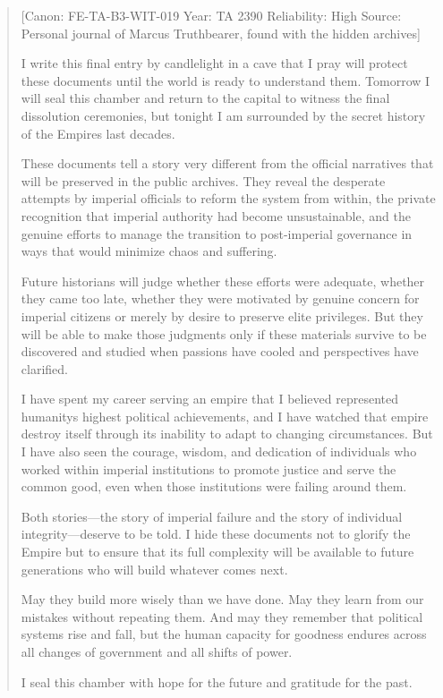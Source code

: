 \begin{quote}
{[}Canon: FE-TA-B3-WIT-019 \textbar{} Year: TA 2390 \textbar{}
Reliability: High \textbar{} Source: Personal journal of Marcus
Truthbearer, found with the hidden archives{]}

I write this final entry by candlelight in a cave that I pray will
protect these documents until the world is ready to understand them.
Tomorrow I will seal this chamber and return to the capital to witness
the final dissolution ceremonies, but tonight I am surrounded by the
secret history of the Empire\textquotesingle s last decades.

These documents tell a story very different from the official narratives
that will be preserved in the public archives. They reveal the desperate
attempts by imperial officials to reform the system from within, the
private recognition that imperial authority had become unsustainable,
and the genuine efforts to manage the transition to post-imperial
governance in ways that would minimize chaos and suffering.

Future historians will judge whether these efforts were adequate,
whether they came too late, whether they were motivated by genuine
concern for imperial citizens or merely by desire to preserve elite
privileges. But they will be able to make those judgments only if these
materials survive to be discovered and studied when passions have cooled
and perspectives have clarified.

I have spent my career serving an empire that I believed represented
humanity\textquotesingle s highest political achievements, and I have
watched that empire destroy itself through its inability to adapt to
changing circumstances. But I have also seen the courage, wisdom, and
dedication of individuals who worked within imperial institutions to
promote justice and serve the common good, even when those institutions
were failing around them.

Both stories---the story of imperial failure and the story of individual
integrity---deserve to be told. I hide these documents not to glorify
the Empire but to ensure that its full complexity will be available to
future generations who will build whatever comes next.

May they build more wisely than we have done. May they learn from our
mistakes without repeating them. And may they remember that political
systems rise and fall, but the human capacity for goodness endures
across all changes of government and all shifts of power.

I seal this chamber with hope for the future and gratitude for the past.
\end{quote}

